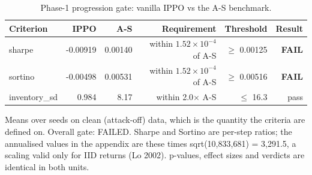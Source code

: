 \begin{table}[htbp]
  \centering
  \caption{Phase-1 progression gate: vanilla IPPO vs the A-S benchmark.}
  \label{tab:gate}
  \begin{tabular}{lrrrrr}
    \toprule
    Criterion & IPPO & A-S & Requirement & Threshold & Result \\
    \midrule
    sharpe & -0.00919 & 0.00140 & within $1.52\times10^{-4}$ of A-S & $\geq$ 0.00125 & \textbf{FAIL} \\
    sortino & -0.00498 & 0.00531 & within $1.52\times10^{-4}$ of A-S & $\geq$ 0.00516 & \textbf{FAIL} \\
    inventory\_sd & 0.984 & 8.17 & within 2.0$\times$ A-S & $\leq$ 16.3 & pass \\
    \bottomrule
  \end{tabular}
  \begin{minipage}{\linewidth}\vspace{4pt}\footnotesize Means over seeds on clean (attack-off) data, which is the quantity the criteria are defined on. Overall gate: FAILED. Sharpe and Sortino are per-step ratios; the annualised values in the appendix are these times sqrt(10,833,681) = 3,291.5, a scaling valid only for IID returns (Lo 2002). p-values, effect sizes and verdicts are identical in both units.\end{minipage}
\end{table}

